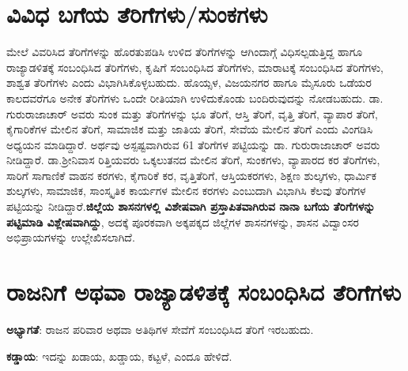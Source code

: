 \newpage

\section*{ವಿವಿಧ ಬಗೆಯ ತೆರಿಗೆಗಳು/ಸುಂಕಗಳು}

ಮೇಲೆ ವಿವರಿಸಿದ ತೆರಿಗೆಗಳನ್ನು ಹೊರತುಪಡಿಸಿ ಉಳಿದ ತೆರಿಗೆಗಳನ್ನು ಆಗಿಂದಾಗ್ಗೆ ವಿಧಿಸಲ್ಪಡುತ್ತಿದ್ದ ಹಾಗೂ ರಾಜ್ಯಾಡಳಿತಕ್ಕೆ ಸಂಬಂಧಿಸಿದ ತೆರಿಗೆಗಳು, ಕೃಷಿಗೆ ಸಂಬಂಧಿಸಿದ ತೆರಿಗೆಗಳು, ಮಾರಾಟಕ್ಕೆ ಸಂಬಂಧಿಸಿದ ತೆರಿಗೆಗಳು, ಶಾಶ್ವತ ತೆರಿಗೆಗಳು ಎಂದು ವಿಭಾಗಿಸಿಕೊಳ್ಳಬಹುದು. ಹೊಯ್ಸಳ, ವಿಜಯನಗರ ಹಾಗೂ ಮೈಸೂರು ಒಡೆಯರ ಕಾಲದವರೆಗೂ ಅನೇಕ ತೆರಿಗೆಗಳು ಒಂದೇ ರೀತಿಯಾಗಿ ಉಳಿದುಕೊಂಡು ಬಂದಿರುವುದನ್ನು ನೋಡಬಹುದು. ಡಾ. ಗುರುರಾಜಾಚಾರ್​ ಅವರು ಸುಂಕ ಮತ್ತು ತೆರಿಗೆಗಳನ್ನು ಭೂ ತೆರಿಗೆ, ಆಸ್ತಿ ತೆರಿಗೆ, ವೃತ್ತಿ ತೆರಿಗೆ, ವ್ಯಾಪಾರ ತೆರಿಗೆ, ಕೈಗಾರಿಕೆಗಳ ಮೇಲಿನ ತೆರಿಗೆ, ಸಾಮಾಜಿಕ ಮತ್ತು ಜಾತಿಯ ತೆರಿಗೆ, ಸೇವೆಯ ಮೇಲಿನ ತೆರಿಗೆ ಎಂದು ವಿಂಗಡಿಸಿ ಅಧ್ಯಯನ ಮಾಡಿದ್ದಾರೆ. ಅರ್ಥವು ಅಸ್ಪಷ್ಟವಾಗಿರುವ 61 ತೆರಿಗೆಗಳ ಪಟ್ಟಿಯನ್ನು ಡಾ. ಗುರುರಾಜಾಚಾರ್ ಅವರು ನೀಡಿದ್ದಾರೆ. ಡಾ.ಶ‍್ರೀನಿವಾಸ ರಿತ್ತಿಯವರು ಒಕ್ಕಲುತನದ ಮೇಲಿನ ತೆರಿಗೆ, ಸುಂಕಗಳು, ವ್ಯಾಪಾರದ ಕರ ತೆರಿಗೆಗಳು, ಸಾರಿಗೆ ಸಾಗಾಣಿಕೆ ವಾಹನ ಕರಗಳು, ಕೈಗಾರಿಕೆ ಕರ, ವೃತ್ತಿತೆರಿಗೆ, ಆಸ್ತಿಯಕರಗಳು, ಶಿಕ್ಷಣ ಶುಲ್ಕಗಳು, ಧಾರ್ಮಿಕ ಶುಲ್ಕಗಳು, ಸಾಮಾಜಿಕ, ಸಾಂಸ್ಕೃತಿಕ ಕಾರ್ಯಗಳ ಮೇಲಿನ ಕರಗಳು ಎಂಬುದಾಗಿ ವಿಭಾಗಿಸಿ ಕೆಲವು ತೆರಿಗೆಗಳ ಪಟ್ಟಿಯನ್ನು ನೀಡಿದ್ದಾರೆ.\textbf{ಜಿಲ್ಲೆಯ ಶಾಸನಗಳಲ್ಲಿ ವಿಶೇಷವಾಗಿ ಪ್ರಸ್ತಾಪಿತವಾಗಿರುವ ನಾನಾ ಬಗೆಯ ತೆರಿಗೆಗಳನ್ನು ಪಟ್ಟಿಮಾಡಿ ವಿಶ್ಲೇಷವಾಗಿದ್ದು}, ಅದಕ್ಕೆ ಪೂರಕವಾಗಿ ಅಕ್ಕಪಕ್ಕದ ಜಿಲ್ಲೆಗಳ ಶಾಸನಗಳನ್ನು, ಶಾಸನ ವಿದ್ವಾಂಸರ ಅಭಿಪ್ರಾಯಗಳನ್ನು ಉಲ್ಲೇಖಿಸಲಾಗಿದೆ.

\vskip 5pt

\section*{ರಾಜನಿಗೆ ಅಥವಾ ರಾಜ್ಯಾಡಳಿತಕ್ಕೆ ಸಂಬಂಧಿಸಿದ ತೆರಿಗೆಗಳು}

\textbf{ಅಭ್ಯಾಗತೆ}: ರಾಜನ ಪರಿವಾರ ಅಥವಾ ಅತಿಥಿಗಳ ಸೇವೆಗೆ ಸಂಬಂಧಿಸಿದ ತೆರಿಗೆ ಇರಬಹುದು.

\vskip 3pt

\textbf{ಕಡ್ಡಾಯ}: ಇದನ್ನು ಖಡಾಯ, ಖಡ್ಡಾಯ, ಕಟ್ಟಳೆ, ಎಂದೂ ಹೇಳಿದೆ.

\vskip 3pt

